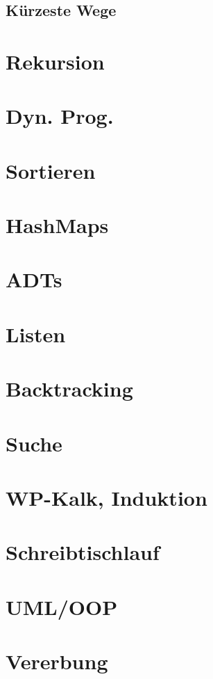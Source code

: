 \documentclass{article}
\begin{document}
	\subsection{Kürzeste Wege}
	\section{Rekursion}
	\section{Dyn. Prog.}
	\section{Sortieren}
	\section{HashMaps}
	\section{ADTs}
	\section{Listen}
	\section{Backtracking}
	\section{Suche}
	\section{WP-Kalk, Induktion}
	\section{Schreibtischlauf}
	\section{UML/OOP}
	\section{Vererbung}
\end{document}
